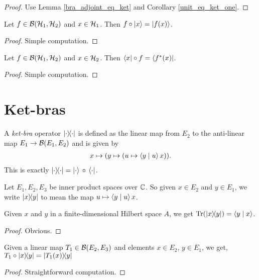  \begin{proof}\leanok
  Use Lemma \ref{bra_adjoint_eq_ket} and Corollary \ref{unit_eq_ket_one}.
 \end{proof}
 \begin{lemma}\label{linearMap_comp_ket}\leanok
  Let $f\in\mathcal{B}(\mathcal{H}_1,\mathcal{H}_2)$ and $x\in\mathcal{H}_1$. Then $f\circ\left\lvert x\right\rangle=\left\lvert f(x)\right\rangle$.
 \end{lemma}
 \begin{proof}\leanok
  Simple computation.
 \end{proof}
 \begin{lemma}\label{bra_comp_linearMap}\leanok
  Let $f\in\mathcal{B}(\mathcal{H}_1,\mathcal{H}_2)$ and $x\in\mathcal{H}_2$. Then $\left\langle x\right\rvert\circ f=\left\langle f^*(x)\right\rvert$.
 \end{lemma}
 \begin{proof}\leanok
  Simple computation.
 \end{proof}

\section{Ket-bras}
 \begin{definition}\label{rankOne}\leanok
  A \textit{ket-bra} operator $\left\lvert\cdot\right\rangle\!\!\left\langle\cdot\right\rvert$ is defined as the linear map from $E_2$ to the anti-linear map $E_1\to\mathcal{B}(E_1,E_2)$ and is given by
  \begin{align*}
   x\mapsto(y\mapsto(u\mapsto\left\langle y \mid u\right\rangle x)).
  \end{align*}
  This is exactly $\left\lvert\cdot\right\rangle\!\!\left\langle\cdot\right\rvert=\left\lvert\cdot\right\rangle\,\circ\,\left\langle\cdot\right\rvert$.
 \end{definition}
 Let $E_1,E_2,E_3$ be inner product spaces over $\mathbb{C}$.
 So given $x\in{E_2}$ and $y\in{E_1}$, we write $\left\lvert x\right\rangle\!\!\left\langle y\right\rvert$ to mean the map $u\mapsto\left\langle y \mid u\right\rangle x$.

 \begin{lemma}\label{rankOne_trace}\leanok
  Given $x$ and $y$ in a finite-dimensional Hilbert space $A$, we get $\operatorname{Tr}(\left\lvert x\right\rangle\!\!\left\langle y\right\rvert)=\left\langle y \mid x\right\rangle$.
 \end{lemma}
 \begin{proof}\leanok
  Obvious.
 \end{proof}

 \begin{corollary}\label{linearMap_comp_rankOne}\leanok
  Given a linear map $T_1\in\mathcal{B}(E_2,E_3)$ and elements $x\in E_2$, $y\in{E_1}$, we get, $T_1\circ\left\lvert x\right\rangle\!\!\left\langle y\right\rvert=\left\lvert T_1(x)\right\rangle\!\!\left\langle y\right\rvert$
 \end{corollary}
 \begin{proof}\leanok
  Straightforward computation.
 \end{proof}
 
